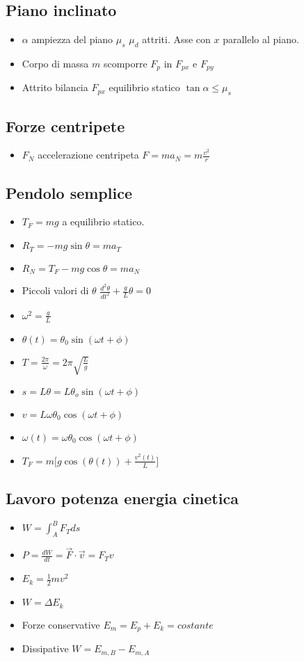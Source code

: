 	\subsection{Piano inclinato}
	\begin{itemize}
		\item $\alpha$ ampiezza del piano $\mu_s$ $\mu_d$ attriti. Asse con $x$ parallelo al piano.
		\item Corpo di massa $m$ scomporre $F_p$ in $F_{px}$ e $F_{py}$
		\item Attrito bilancia $F_{px}$ equilibrio statico $\tan\alpha\le \mu_s$
	\end{itemize}
	\subsection{Forze centripete}
	\begin{itemize}
		\item $F_N$ accelerazione centripeta $F = ma_N = m\frac{v^2}{r}$
	\end{itemize}
	\subsection{Pendolo semplice}
	\begin{itemize}
		\item $T_F = mg$ a equilibrio statico.
		\item $R_T = -mg\sin\theta = ma_T$
		\item $R_N = T_F -mg\cos\theta = ma_N$
		\item Piccoli valori di $\theta$ $\frac{d^2\theta}{dt^2} + \frac{g}{L}\theta = 0$
		\item $\omega^2 = \frac{g}{L}$
		\item $\theta(t)= \theta_0\sin(\omega t+\phi)$
		\item $T = \frac{2\pi}{\omega} = 2\pi\sqrt{\frac{L}{g}}$
		\item $s = L\theta = L\theta_o\sin(\omega t+\phi)$
		\item $v = L\omega\theta_0\cos(\omega t+\phi)$
		\item $\omega(t) = \omega\theta_0\cos(\omega t+\phi)$
		\item $T_F = m\bigl[g\cos(\theta(t)) + \frac{v^2(t)}{L}\bigr]$
	\end{itemize}
	\subsection{Lavoro potenza energia cinetica}
	\begin{itemize}
		\item $W = \int_A^BF_Tds$
		\item $P = \frac{dW}{dt} = \overrightarrow{F}\cdot\overrightarrow{v} = F_Tv$
		\item $E_k = \frac{1}{2}mv^2$
		\item $W = \Delta E_k$
		\item Forze conservative $E_m = E_p + E_k = costante$
		\item Dissipative $W = E_{m,B} - E_{m,A}$
	\end{itemize}
